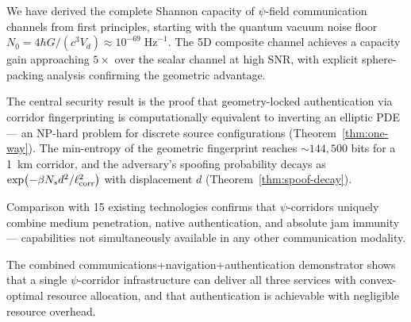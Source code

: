 \documentclass[twocolumn,superscriptaddress,prd,nofootinbib]{revtex4-2}
\begin{document}
We have derived the complete Shannon capacity of $\psi$-field
communication channels from first principles, starting with the quantum
vacuum noise floor
$N_0 = 4\hbar G/(c^3 V_d) \approx 10^{-69}\;\text{Hz}^{-1}$. The 5D
composite channel achieves a capacity gain approaching $5\times$ over
the scalar channel at high SNR, with explicit sphere-packing analysis
confirming the geometric advantage.

The central security result is the proof that geometry-locked
authentication via corridor fingerprinting is computationally equivalent
to inverting an elliptic PDE --- an NP-hard problem for discrete source
configurations (Theorem~\ref{thm:one-way}). The min-entropy of the
geometric fingerprint reaches $\sim 144{,}500$ bits for a 1~km corridor,
and the adversary's spoofing probability decays as
$\exp(-\beta N_s d^2/\ell_{\rm corr}^2)$ with displacement $d$
(Theorem~\ref{thm:spoof-decay}).

Comparison with 15 existing technologies confirms that $\psi$-corridors
uniquely combine medium penetration, native authentication, and
absolute jam immunity --- capabilities not simultaneously available in
any other communication modality.

The combined communications+navigation+authentication demonstrator
shows that a single $\psi$-corridor infrastructure can deliver all three
services with convex-optimal resource allocation, and that authentication
is achievable with negligible resource overhead.
\end{document}

